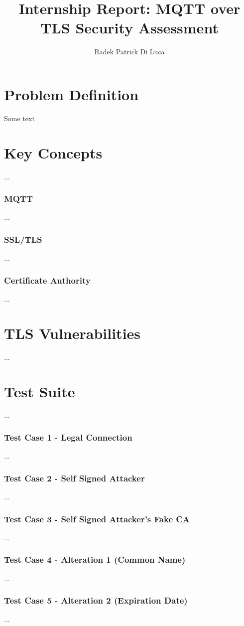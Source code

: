 \documentclass[binding=0.6cm,noexaminfo]{sapthesis}
\title{Internship Report: MQTT over TLS Security Assessment} \author{Radek Patrick Di Luca}
\begin{document}
\frontmatter
\maketitle
\tableofcontents
\mainmatter
\chapter{Problem Definition} Some text
\chapter{Key Concepts} ...
\subsection{MQTT} ...
\subsection{SSL/TLS} ...
\subsection{Certificate Authority} ...
\chapter{TLS Vulnerabilities} ...
\chapter{Test Suite} ...
\subsection{Test Case 1 - Legal Connection} ...
\subsection{Test Case 2 - Self Signed Attacker} ...
\subsection{Test Case 3 - Self Signed Attacker's Fake CA} ...
\subsection{Test Case 4 - Alteration 1 (Common Name)} ...
\subsection{Test Case 5 - Alteration 2 (Expiration Date)} ...
\end{document}
